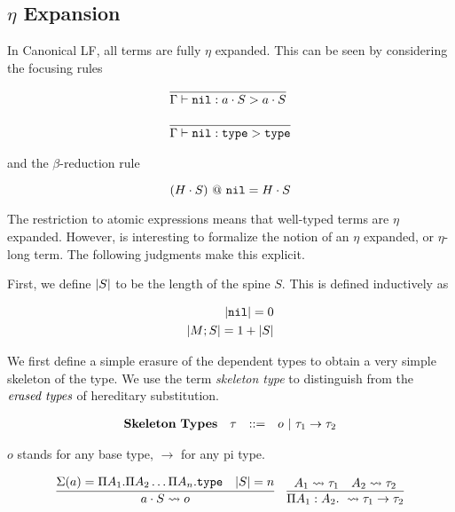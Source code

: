 \documentclass[11pt,twoside]{article}
\begin{document}

\subsection{$\eta$ Expansion}

In Canonical LF, all terms are fully $\eta$ expanded.  This can be seen
by considering the focusing rules

$$
\begin{array}{lr}
\infer{\Focus{\Nil}{a\cdot S}{a\cdot S}}{}\\
\\
\infer{\Focus{\Nil}{\Type}{\Type}}{} 
\end{array} 
$$

and the $\beta$-reduction rule

$$
(H\cdot S)~@~\mathtt{nil} = H\cdot S
$$

The restriction to atomic expressions means that well-typed terms
are $\eta$ expanded.  However, is interesting to formalize the notion
of an $\eta$ expanded, or $\eta$-long term.  The following judgments
make this explicit.

First, we define $\left|S\right|$ to be the length of the spine $S$.  
This is defined inductively as 

\begin{align*} 
\left|\mathtt{nil}\right| = 0\\
\left|M;S\right| = 1 + \left|S\right|
\end{align*} 

We first define a simple erasure of the dependent types to obtain
a very simple skeleton of the type.  We use the term \emph{skeleton type}
to distinguish from the $\emph{erased types}$ of hereditary substitution.

\newcommand{\Skel}[2]{#1 \rightsquigarrow #2}
\newcommand{\SkBase}{o}

$$
\begin{array}{llll}
\mathbf{Skeleton\ Types} & \tau & ::= & \SkBase \Spb \tau_1\to\tau_2 \\
\end{array} 
$$

$o$ stands for any base type, $\to$ for any pi type.

\bigskip 
\framebox{$\Skel{A}{\tau}$}
\bigskip 

$$
\begin{array}{lr}
\infer{\Skel{a\cdot S}{\SkBase}}{\Sigma(a) = \Pi A_1.\Pi A_2\ldots\Pi A_n.\Type & \card{S}=n}&
\infer{\Skel{\PiTyp{A_1}{A_2}}{\tau_1\to\tau_2}}{\Skel{A_1}{\tau_1} & \Skel{A_2}{\tau_2}}
\end{array} 
$$
\end{document}
